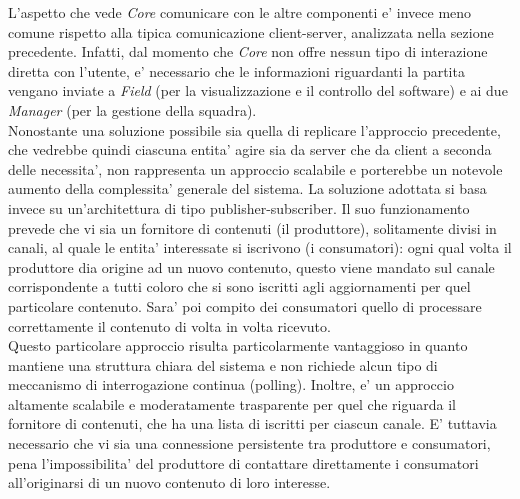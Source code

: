L'aspetto che vede \textit{Core} comunicare con le altre componenti e' invece meno comune rispetto alla tipica comunicazione client-server, analizzata nella sezione precedente. Infatti, dal momento che \textit{Core} non offre nessun tipo di interazione diretta con l'utente, e' necessario che le informazioni riguardanti la partita vengano inviate a \textit{Field} (per la visualizzazione e il controllo del software) e ai due \textit{Manager} (per la gestione della squadra).\\

Nonostante una soluzione possibile sia quella di replicare l'approccio precedente, che vedrebbe quindi ciascuna entita' agire sia da server che da client a seconda delle necessita', non rappresenta un approccio scalabile e porterebbe un notevole aumento della complessita' generale del sistema. La soluzione adottata si basa invece su un'architettura di tipo publisher-subscriber. Il suo funzionamento prevede che vi sia un fornitore di contenuti (il produttore), solitamente divisi in canali, al quale le entita' interessate si iscrivono (i consumatori): ogni qual volta il produttore dia origine ad un nuovo contenuto, questo viene mandato sul canale corrispondente a tutti coloro che si sono iscritti agli aggiornamenti per quel particolare contenuto. Sara' poi compito dei consumatori quello di processare correttamente il contenuto di volta in volta ricevuto.\\

Questo particolare approccio risulta particolarmente vantaggioso in quanto mantiene una struttura chiara del sistema e non richiede alcun tipo di meccanismo di interrogazione continua (polling). Inoltre, e' un approccio altamente scalabile e moderatamente trasparente per quel che riguarda il fornitore di contenuti, che ha una lista di iscritti per ciascun canale. E' tuttavia necessario che vi sia una connessione persistente tra produttore e consumatori, pena l'impossibilita' del produttore di contattare direttamente i consumatori all'originarsi di un nuovo contenuto di loro interesse.
